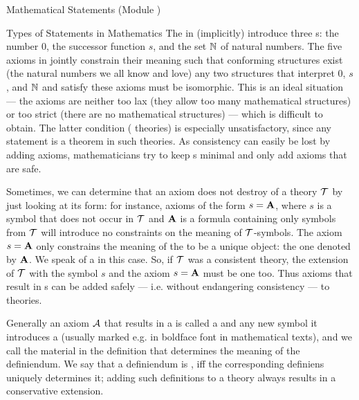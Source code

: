 \begin{tchapter}[id=statements,short=Mathematical Statements]{Mathematical Statements (Module {})}
\begin{tsection}[id=statements-constitutive]{Types of Statements in Mathematics}
The {} in {} (implicitly) introduce three
{s}: the number 0, the successor function $s$, and the set ${\mathbb{N}}$ of
natural numbers. The five axioms in {} jointly constrain their meaning
such that conforming structures exist (the natural numbers we all know and love) any two
structures that interpret 0, $s$, and ${\mathbb{N}}$ and satisfy these axioms must be isomorphic.
This is an ideal situation --- the axioms are neither too lax (they allow too many
mathematical structures) or too strict (there are no mathematical structures) --- which is
difficult to obtain. The latter condition ({} theories) is especially
unsatisfactory, since any statement is a theorem in such theories. As consistency can
easily be lost by adding axioms, mathematicians try to keep {s}
minimal and only add axioms that are safe.
  
Sometimes, we can determine that an axiom does not destroy {} of a
theory ${\cal T}$ by just looking at its form: for instance, axioms of the form $s={\bf A}$, where
$s$ is a symbol that does not occur in ${\cal T}$ and ${\bf A}$ is a formula containing only
symbols from ${\cal T}$ will introduce no constraints on the meaning of ${\cal T}$-symbols. The
axiom $s={\bf A}$ only constrains the meaning of the {} to be a unique
object: the one denoted by ${\bf A}$. We speak of a {} in
this case. So, if ${\cal T}$ was a consistent theory, the extension of ${\cal T}$ with the symbol
$s$ and the axiom $s={\bf A}$ must be one too. Thus axioms that result in
{s} can be added safely --- i.e. without endangering
consistency --- to theories.
  
Generally an axiom ${\cal A}$ that results in a {} is called a
{} and any new symbol it introduces a {} (usually
marked e.g. in boldface font in mathematical texts), and we call {} the
material in the definition that determines the meaning of the definiendum. We say that a
definiendum is {}, iff the corresponding definiens uniquely determines it;
adding such definitions to a theory always results in a conservative extension.


\end{tsection}
\end{tchapter}
